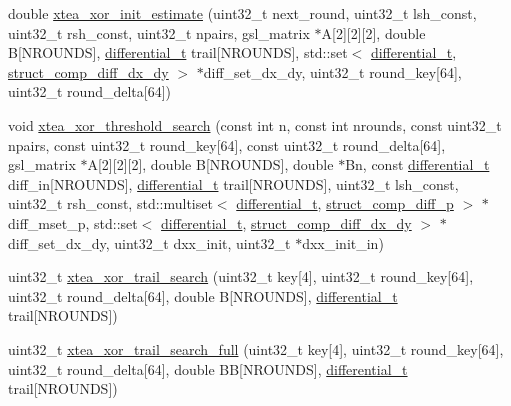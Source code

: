 \begin{DoxyCompactItemize}
\item 
double \hyperlink{xtea-xor-threshold-search_8hh_a91f5b9d37a2c3701676d92f8402a2d8d}{xtea\-\_\-xor\-\_\-init\-\_\-estimate} (uint32\-\_\-t next\-\_\-round, uint32\-\_\-t lsh\-\_\-const, uint32\-\_\-t rsh\-\_\-const, uint32\-\_\-t npairs, gsl\-\_\-matrix $\ast$\-A\mbox{[}2\mbox{]}\mbox{[}2\mbox{]}\mbox{[}2\mbox{]}, double \-B\mbox{[}\-N\-R\-O\-U\-N\-D\-S\mbox{]}, \hyperlink{structdifferential__t}{differential\-\_\-t} trail\mbox{[}\-N\-R\-O\-U\-N\-D\-S\mbox{]}, std\-::set$<$ \hyperlink{structdifferential__t}{differential\-\_\-t}, \hyperlink{structstruct__comp__diff__dx__dy}{struct\-\_\-comp\-\_\-diff\-\_\-dx\-\_\-dy} $>$ $\ast$diff\-\_\-set\-\_\-dx\-\_\-dy, uint32\-\_\-t round\-\_\-key\mbox{[}64\mbox{]}, uint32\-\_\-t round\-\_\-delta\mbox{[}64\mbox{]})
\item 
void \hyperlink{xtea-xor-threshold-search_8hh_a04cc0c55d61b755d6b9435e301420f0f}{xtea\-\_\-xor\-\_\-threshold\-\_\-search} (const int n, const int nrounds, const uint32\-\_\-t npairs, const uint32\-\_\-t round\-\_\-key\mbox{[}64\mbox{]}, const uint32\-\_\-t round\-\_\-delta\mbox{[}64\mbox{]}, gsl\-\_\-matrix $\ast$\-A\mbox{[}2\mbox{]}\mbox{[}2\mbox{]}\mbox{[}2\mbox{]}, double \-B\mbox{[}\-N\-R\-O\-U\-N\-D\-S\mbox{]}, double $\ast$\-Bn, const \hyperlink{structdifferential__t}{differential\-\_\-t} diff\-\_\-in\mbox{[}\-N\-R\-O\-U\-N\-D\-S\mbox{]}, \hyperlink{structdifferential__t}{differential\-\_\-t} trail\mbox{[}\-N\-R\-O\-U\-N\-D\-S\mbox{]}, uint32\-\_\-t lsh\-\_\-const, uint32\-\_\-t rsh\-\_\-const, std\-::multiset$<$ \hyperlink{structdifferential__t}{differential\-\_\-t}, \hyperlink{structstruct__comp__diff__p}{struct\-\_\-comp\-\_\-diff\-\_\-p} $>$ $\ast$diff\-\_\-mset\-\_\-p, std\-::set$<$ \hyperlink{structdifferential__t}{differential\-\_\-t}, \hyperlink{structstruct__comp__diff__dx__dy}{struct\-\_\-comp\-\_\-diff\-\_\-dx\-\_\-dy} $>$ $\ast$diff\-\_\-set\-\_\-dx\-\_\-dy, uint32\-\_\-t dxx\-\_\-init, uint32\-\_\-t $\ast$dxx\-\_\-init\-\_\-in)
\item 
uint32\-\_\-t \hyperlink{xtea-xor-threshold-search_8hh_a755f7a2a412e54249912f5d79dd089d0}{xtea\-\_\-xor\-\_\-trail\-\_\-search} (uint32\-\_\-t key\mbox{[}4\mbox{]}, uint32\-\_\-t round\-\_\-key\mbox{[}64\mbox{]}, uint32\-\_\-t round\-\_\-delta\mbox{[}64\mbox{]}, double \-B\mbox{[}\-N\-R\-O\-U\-N\-D\-S\mbox{]}, \hyperlink{structdifferential__t}{differential\-\_\-t} trail\mbox{[}\-N\-R\-O\-U\-N\-D\-S\mbox{]})
\item 
uint32\-\_\-t \hyperlink{xtea-xor-threshold-search_8hh_a85aae29867c82160c8871fa17a34e5bb}{xtea\-\_\-xor\-\_\-trail\-\_\-search\-\_\-full} (uint32\-\_\-t key\mbox{[}4\mbox{]}, uint32\-\_\-t round\-\_\-key\mbox{[}64\mbox{]}, uint32\-\_\-t round\-\_\-delta\mbox{[}64\mbox{]}, double \-B\-B\mbox{[}\-N\-R\-O\-U\-N\-D\-S\mbox{]}, \hyperlink{structdifferential__t}{differential\-\_\-t} trail\mbox{[}\-N\-R\-O\-U\-N\-D\-S\mbox{]})
\end{DoxyCompactItemize}


